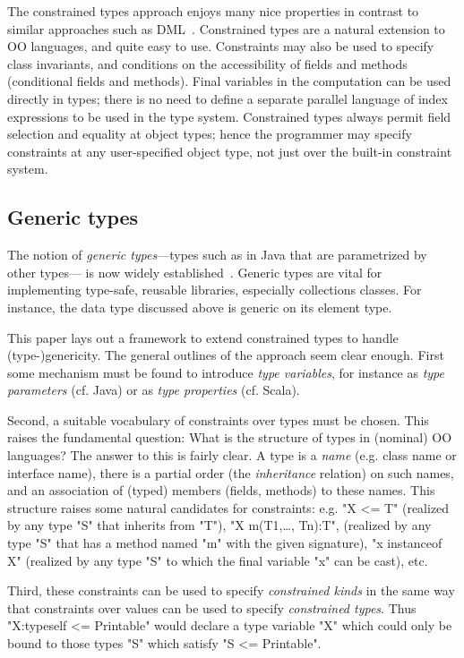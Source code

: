 The constrained types approach enjoys many nice properties in contrast
to similar approaches such as DML~\cite{xi99dependent}.  Constrained
types are a natural extension to OO languages, and quite easy to
use. Constraints may also be used to specify class invariants, and
conditions on the accessibility of fields and methods (conditional
fields and methods).  Final variables in the computation can be used
directly in types; there is no need to define a separate
parallel language of index expressions to be used in the type system.
Constrained types always
permit field selection and equality at object types; hence the
programmer may specify constraints at any user-specified object type,
not just over the built-in constraint system.  

\subsection{Generic types}
The notion of \emph{generic types}---types such as  in
Java that are parametrized by other types--- is now widely
established~\cite{clu,ada,GJ,java-popl97,thorup97,Java3,csharp-generics}.
Generic types are vital for implementing type-safe, reusable
libraries, especially collections classes.  For instance, the data
type  discussed above is generic on its element type.

This paper lays out a framework to extend constrained types to handle
(type-)genericity. The general outlines of the approach seem clear
enough. First some mechanism must be found to introduce {\em type
variables}, for instance as {\em type parameters} (cf. Java) or as
{\em type properties} (cf. Scala). 

Second, a suitable vocabulary of constraints over types must be
chosen. This raises the fundamental question: What is the structure of
types in (nominal) OO languages?  The answer to this is fairly
clear. A type is a {\em name} (e.g. class name or interface name),
there is a partial order (the {\em inheritance} relation) on such
names, and an association of (typed) members (fields, methods) to
these names. This structure raises some natural candidates for
constraints: e.g.{} \xcd"X <= T" (realized by any type \xcd"S" that
inherits from \xcd"T"), \xcd"X \uhas m(T1,\ldots, Tn):T", (realized by
any type \xcd"S" that has a method named \xcd"m" with the given
signature), \xcd"x instanceof X" (realized by any type
\xcd"S" to which the final variable 
\xcd"x" can be cast), etc. 

Third, these constraints can be used to specify {\em constrained
kinds} in the same way that constraints over values can be used to
specify {\em constrained types}. Thus \xcd"X:type{self <= Printable}"
would declare a type variable \xcd"X" which could only be bound to
those types \xcd"S" which satisfy \xcd"S <= Printable".

